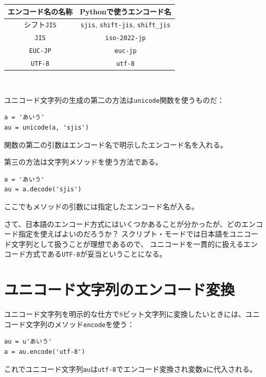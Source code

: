 \documentclass[a4j,12pt,makeidx]{jbook}
\begin{document}
\begin{tabular}{|c|c|} \hline
 エンコード名の名称	&  Pythonで使うエンコード名 \\ \hline
 シフト{\tt JIS}  &  {\tt sjis}, {\tt shift-jis}, {\tt shift\_jis} \\ \hline
 {\tt JIS}  &  {\tt iso-2022-jp}  \\ \hline
 {\tt EUC-JP}  &  {\tt euc-jp}  \\ \hline
 {\tt UTF-8}  &  {\tt utf-8}  \\ \hline
\end{tabular} \\
%
\bigskip

\indent
ユニコード文字列の生成の第二の方法は{\tt unicode}関数を使うものだ：
\begin{verbatim}
a = 'あいう'
au = unicode(a, 'sjis')
\end{verbatim}
関数の第二の引数はエンコード名で明示したエンコード名を入れる。\par
第三の方法は文字列メソッドを使う方法である。
\begin{verbatim}
a = 'あいう'
au = a.decode('sjis')
\end{verbatim}
ここでもメソッドの引数には指定したエンコード名が入る。\par
さて、日本語のエンコード方式にはいくつかあることが分かったが、どのエンコード指定を使えばよいのだろうか？
スクリプト・モードでは日本語をユニコード文字列として扱うことが理想であるので、
ユニコードを一貫的に扱えるエンコード方式である{\tt UTF-8}が妥当ということになる。
%
\section{ユニコード文字列のエンコード変換}
ユニコード文字列を明示的な仕方で8ビット文字列に変換したいときには、ユニコード文字列のメソッド{\tt encode}を使う：
\begin{verbatim}
au = u'あいう'
a = au.encode('utf-8')
\end{verbatim}
これでユニコード文字列{\tt au}は{\tt utf-8}でエンコード変換され変数{\tt a}に代入される。
%
\end{document}
